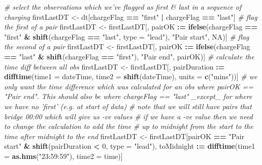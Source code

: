 \documentclass[]{article}
\newenvironment{Shaded}{\begin{snugshade}}{\end{snugshade}}
\newcommand{\KeywordTok}[1]{\textcolor[rgb]{0.13,0.29,0.53}{\textbf{#1}}}
\newcommand{\DataTypeTok}[1]{\textcolor[rgb]{0.13,0.29,0.53}{#1}}
\newcommand{\DecValTok}[1]{\textcolor[rgb]{0.00,0.00,0.81}{#1}}
\newcommand{\StringTok}[1]{\textcolor[rgb]{0.31,0.60,0.02}{#1}}
\newcommand{\CommentTok}[1]{\textcolor[rgb]{0.56,0.35,0.01}{\textit{#1}}}
\newcommand{\OtherTok}[1]{\textcolor[rgb]{0.56,0.35,0.01}{#1}}
\newcommand{\OperatorTok}[1]{\textcolor[rgb]{0.81,0.36,0.00}{\textbf{#1}}}
\newcommand{\ErrorTok}[1]{\textcolor[rgb]{0.64,0.00,0.00}{\textbf{#1}}}
\newcommand{\NormalTok}[1]{#1}
\begin{document}
\begin{Shaded}
\begin{Highlighting}[]
\CommentTok{# select the observations which we've flagged as first & last in a sequence of charging}
\NormalTok{firstLastDT <-}\StringTok{ }\NormalTok{dt[chargeFlag }\OperatorTok{==}\StringTok{ "first"} \OperatorTok{|}\StringTok{ }\NormalTok{chargeFlag }\OperatorTok{==}\StringTok{ "last"}\NormalTok{]}
\CommentTok{# flag the first of a pair}
\NormalTok{firstLastDT <-}\StringTok{ }\NormalTok{firstLastDT[, pairOK }\OperatorTok{:}\ErrorTok{=}\StringTok{ }\KeywordTok{ifelse}\NormalTok{(chargeFlag }\OperatorTok{==}\StringTok{ "first"} \OperatorTok{&}\StringTok{ }\KeywordTok{shift}\NormalTok{(chargeFlag }\OperatorTok{==}\StringTok{ "last"}\NormalTok{, }\DataTypeTok{type =} \StringTok{"lead"}\NormalTok{), }\StringTok{"Pair start"}\NormalTok{, }\OtherTok{NA}\NormalTok{)]}
\CommentTok{# flag the second of a pair}
\NormalTok{firstLastDT <-}\StringTok{ }\NormalTok{firstLastDT[, pairOK }\OperatorTok{:}\ErrorTok{=}\StringTok{ }\KeywordTok{ifelse}\NormalTok{(chargeFlag }\OperatorTok{==}\StringTok{ "last"} \OperatorTok{&}\StringTok{ }\KeywordTok{shift}\NormalTok{(chargeFlag }\OperatorTok{==}\StringTok{ "first"}\NormalTok{), }\StringTok{"Pair end"}\NormalTok{, pairOK)]}
\CommentTok{# calculate the time diff between all obs}
\NormalTok{firstLastDT <-}\StringTok{ }\NormalTok{firstLastDT[, pairDuration }\OperatorTok{:}\ErrorTok{=}\StringTok{ }\KeywordTok{difftime}\NormalTok{(}\DataTypeTok{time1 =}\NormalTok{ dateTime, }\DataTypeTok{time2 =} \KeywordTok{shift}\NormalTok{(dateTime), }\DataTypeTok{units =} \KeywordTok{c}\NormalTok{(}\StringTok{"mins"}\NormalTok{))]}
\CommentTok{# we only want the time difference which was calculated for an obs where pairOK == "Pair end". This should also be where chargeFlag == "last" _except_ for where we have no 'first' (e.g. at start of data)}
\CommentTok{# note that we will still have pairs that bridge 00:00 which will give us -ve values}
\CommentTok{# if we have a -ve value then we need to change the calculation to add the time}
\CommentTok{# up to midnight from the start to the time after midnight to the end}
\NormalTok{firstLastDT <-}\StringTok{ }\NormalTok{firstLastDT[pairOK }\OperatorTok{==}\StringTok{ "Pair start"} \OperatorTok{&}\StringTok{ }\KeywordTok{shift}\NormalTok{(pairDuration }\OperatorTok{<}\StringTok{ }\DecValTok{0}\NormalTok{, }\DataTypeTok{type =} \StringTok{"lead"}\NormalTok{), }
\NormalTok{                           toMidnight }\OperatorTok{:}\ErrorTok{=}\StringTok{ }\KeywordTok{difftime}\NormalTok{(}\DataTypeTok{time1 =} \KeywordTok{as.hms}\NormalTok{(}\StringTok{"23:59:59"}\NormalTok{), }\DataTypeTok{time2 =}\NormalTok{ time)]}

\end{Highlighting}
\end{Shaded}
\end{document}
